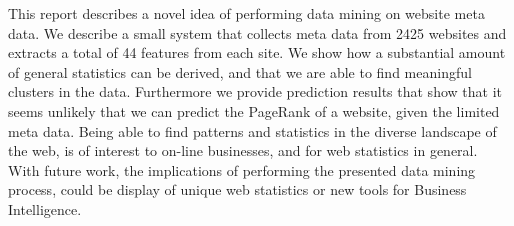 
This report describes a novel idea of performing data mining on website meta data. We describe a small system that collects meta data from 2425 websites and extracts a total of 44 features from each site. We show how a substantial amount of general statistics can be derived, and that we are able to find meaningful clusters in the data. Furthermore we provide prediction results that show that it seems unlikely that we can predict the PageRank of a website, given the limited meta data. Being able to find patterns and statistics in the diverse landscape of the web, is of interest to on-line businesses, and for web statistics in general. With future work, the implications of performing the presented data mining process, could be display of unique web statistics or new tools for Business Intelligence.